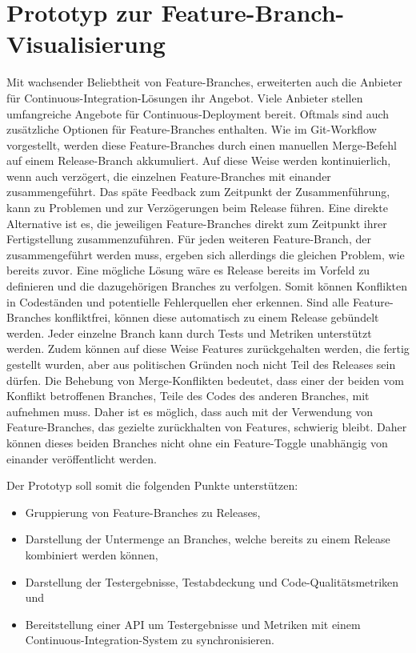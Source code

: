 \section{Prototyp zur Feature-Branch-Visualisierung}

Mit wachsender Beliebtheit von Feature-Branches, erweiterten auch die Anbieter für Continuous-Integration-Lösungen ihr Angebot. Viele Anbieter stellen umfangreiche Angebote für Continuous-Deployment bereit. Oftmals sind auch zusätzliche Optionen für Feature-Branches enthalten. Wie im Git-Workflow vorgestellt, werden diese Feature-Branches durch einen manuellen Merge-Befehl auf einem Release-Branch akkumuliert. Auf diese Weise werden kontinuierlich, wenn auch verzögert, die einzelnen Feature-Branches mit einander zusammengeführt. Das späte Feedback zum Zeitpunkt der Zusammenführung, kann zu Problemen und zur Verzögerungen beim Release führen. Eine direkte Alternative ist es, die jeweiligen Feature-Branches direkt zum Zeitpunkt ihrer Fertigstellung zusammenzuführen. Für jeden weiteren Feature-Branch, der zusammengeführt werden muss, ergeben sich allerdings die gleichen Problem, wie bereits zuvor.
Eine mögliche Lösung wäre es Release bereits im Vorfeld zu definieren und die dazugehörigen Branches zu verfolgen. Somit können Konflikten in Codeständen und potentielle Fehlerquellen eher erkennen. Sind alle Feature-Branches konfliktfrei, können diese automatisch zu einem Release gebündelt werden. Jeder einzelne Branch kann durch Tests und Metriken unterstützt werden. Zudem können auf diese Weise Features zurückgehalten werden, die fertig gestellt wurden, aber aus politischen Gründen noch nicht Teil des Releases sein dürfen. 
Die Behebung von Merge-Konflikten bedeutet, dass einer der beiden vom Konflikt betroffenen Branches, Teile des Codes des anderen Branches, mit aufnehmen muss. Daher ist es möglich, dass auch mit der Verwendung von Feature-Branches, das gezielte zurückhalten von Features, schwierig bleibt. Daher können dieses beiden Branches nicht ohne ein Feature-Toggle unabhängig von einander veröffentlicht werden.

Der Prototyp soll somit die folgenden Punkte unterstützen:
\begin{itemize}
\item Gruppierung von Feature-Branches zu Releases,
\item Darstellung der Untermenge an Branches, welche bereits zu einem Release kombiniert werden können,
\item Darstellung der Testergebnisse, Testabdeckung und Code-Qualitätsmetriken und
\item Bereitstellung einer API um Testergebnisse und Metriken mit einem Continuous-Integration-System zu synchronisieren.
\end{itemize}

